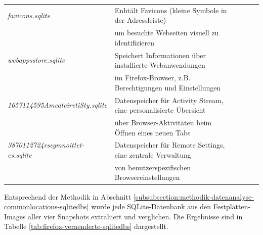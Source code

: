 \begin{appendices}
\begin{table}[h!]
{\begin{tabular}{|l|l|lll}
\textit{favicons.sqlite}                  & Enhtält Favicons (kleine Symbole in der Adressleiste)\\&um besuchte Webseiten visuell zu identifizieren                   &  &  &  \\ \cline{1-2}
\textit{webappsstore.sqlite}              & Speichert Informationen über installierte Webanwendungen\\&im Firefox-Browser, z.B. Berechtigungen und Einstellungen      &  &  &  \\ \cline{1-2}
\textit{1657114595AmcateirvtiSty.sqlite}  & Datenspeicher für Activity Stream, eine personalisierte Übersicht\\&über Browser-Aktivitäten beim Öffnen eines neuen Tabs &  &  &  \\ \cline{1-2}
\textit{3870112724rsegmnoittet-es.sqlite} & Datenspeicher für Remote Settings, eine zentrale Verwaltung\\&von benutzerspezifischen Browsereinstellungen               &  &  &  \\ \cline{1-2}
\end{tabular}
}
\end{table}

Entsprechend der Methodik in Abschnitt \ref{subsubsection:methodik-datenanalyse-commonlocations-sqlitedbs} wurde jede SQLite-Datenbank aus den Festplatten-Images aller vier Snapshots extrahiert und verglichen.
Die Ergebnisse sind in Tabelle \ref{tab:firefox-veraenderte-sqlitedbs} dargestellt.


\end{appendices}
